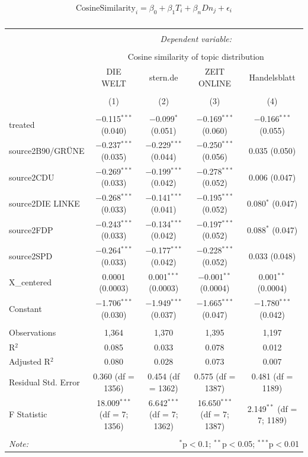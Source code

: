 \documentclass[
]{article}
\begin{document}
\[
\text{CosineSimilarity}_{i}=\beta_0+\beta_1T_i+\beta_nDn_{j}+\epsilon_i
\]

\begin{table}[!htbp] \centering 
  \caption{} 
  \label{} 
\tiny 
\begin{tabular}{@{\extracolsep{5pt}}lcccc} 
\\[-1.8ex]\hline 
\hline \\[-1.8ex] 
 & \multicolumn{4}{c}{\textit{Dependent variable:}} \\ 
\cline{2-5} 
\\[-1.8ex] & \multicolumn{4}{c}{Cosine similarity of topic distribution} \\ 
 & DIE WELT & stern.de & ZEIT ONLINE & Handelsblatt \\ 
\\[-1.8ex] & (1) & (2) & (3) & (4)\\ 
\hline \\[-1.8ex] 
 treated & $-$0.115$^{***}$ (0.040) & $-$0.099$^{*}$ (0.051) & $-$0.169$^{***}$ (0.060) & $-$0.166$^{***}$ (0.055) \\ 
  source2B90/GRÜNE & $-$0.237$^{***}$ (0.035) & $-$0.229$^{***}$ (0.044) & $-$0.250$^{***}$ (0.056) & 0.035 (0.050) \\ 
  source2CDU & $-$0.269$^{***}$ (0.033) & $-$0.199$^{***}$ (0.042) & $-$0.278$^{***}$ (0.052) & 0.006 (0.047) \\ 
  source2DIE LINKE & $-$0.268$^{***}$ (0.033) & $-$0.141$^{***}$ (0.041) & $-$0.195$^{***}$ (0.052) & 0.080$^{*}$ (0.047) \\ 
  source2FDP & $-$0.243$^{***}$ (0.033) & $-$0.134$^{***}$ (0.042) & $-$0.197$^{***}$ (0.052) & 0.088$^{*}$ (0.047) \\ 
  source2SPD & $-$0.264$^{***}$ (0.033) & $-$0.177$^{***}$ (0.042) & $-$0.228$^{***}$ (0.052) & 0.033 (0.048) \\ 
  X\_centered & 0.0001 (0.0003) & 0.001$^{***}$ (0.0003) & $-$0.001$^{**}$ (0.0004) & 0.001$^{**}$ (0.0004) \\ 
  Constant & $-$1.706$^{***}$ (0.030) & $-$1.949$^{***}$ (0.037) & $-$1.665$^{***}$ (0.047) & $-$1.780$^{***}$ (0.042) \\ 
 \hline \\[-1.8ex] 
Observations & 1,364 & 1,370 & 1,395 & 1,197 \\ 
R$^{2}$ & 0.085 & 0.033 & 0.078 & 0.012 \\ 
Adjusted R$^{2}$ & 0.080 & 0.028 & 0.073 & 0.007 \\ 
Residual Std. Error & 0.360 (df = 1356) & 0.454 (df = 1362) & 0.575 (df = 1387) & 0.481 (df = 1189) \\ 
F Statistic & 18.009$^{***}$ (df = 7; 1356) & 6.642$^{***}$ (df = 7; 1362) & 16.650$^{***}$ (df = 7; 1387) & 2.149$^{**}$ (df = 7; 1189) \\ 
\hline 
\hline \\[-1.8ex] 
\textit{Note:}  & \multicolumn{4}{r}{$^{*}$p$<$0.1; $^{**}$p$<$0.05; $^{***}$p$<$0.01} \\ 
\end{tabular} 
\end{table}
\end{document}
